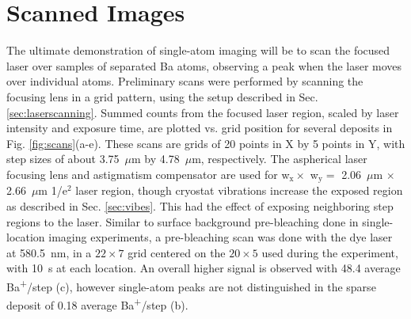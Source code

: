 
\section{Scanned Images}
\label{sec:scanning}

The ultimate demonstration of single-atom imaging will be to scan the focused laser over samples of separated Ba atoms, observing a peak when the laser moves over individual atoms.  Preliminary scans were performed by scanning the focusing lens in a grid pattern, using the setup described in Sec. \ref{sec:laserscanning}.  Summed counts from the focused laser region, scaled by laser intensity and exposure time, are plotted vs. grid position for several deposits in Fig. \ref{fig:scans}(a-e).  These scans are grids of 20 points in X by 5 points in Y, with step sizes of about 3.75~$\mu$m by 4.78~$\mu$m, respectively.  The aspherical laser focusing lens and astigmatism compensator are used for w$_{\text{x}} \times$ w$_{\text{y}} =$ 2.06~$\mu$m $\times$ 2.66~$\mu$m 1/e$^{2}$ laser region, though cryostat vibrations increase the exposed region as described in Sec. \ref{sec:vibes}.  This had the effect of exposing neighboring step regions to the laser.  Similar to surface background pre-bleaching done in single-location imaging experiments, a pre-bleaching scan was done with the dye laser at 580.5~nm, in a $22 \times 7$ grid centered on the $20 \times 5$ used during the experiment, with 10~s at each location.  An overall higher signal is observed with 48.4 average Ba\textsuperscript{+}/step (c), however single-atom peaks are not distinguished in the sparse deposit of 0.18 average Ba\textsuperscript{+}/step (b).

